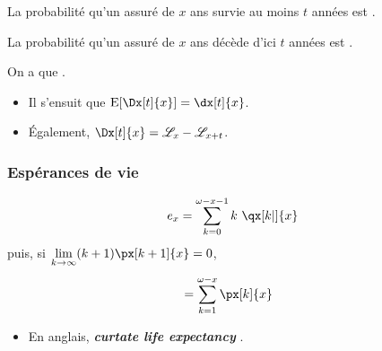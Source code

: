 \documentclass[10pt, french]{article}
\begin{document}
\begin{multicols*}{2}
\begin{definitionNOHFILLsub}
La probabilité qu'un assuré de $x$ ans survie au moins $t$ années est .
\end{definitionNOHFILLsub}

\begin{definitionNOHFILLsub}
La probabilité qu'un assuré de $x$ ans décède d'ici $t$ années est .
\end{definitionNOHFILLsub}


\begin{definitionNOHFILL}
On a que .

\begin{itemize}
	\item	Il s'ensuit que $\text{E}[\Dx[t]{x}] = \dx[t]{x}$.
	\item	Également, $\Dx[t]{x} = \mathscr{L}_{x} - \mathscr{L}_{x + t}$.
\end{itemize}
\end{definitionNOHFILL}


\columnbreak
\subsubsection{Espérances de vie}
\setlength{\mathindent}{-1cm}
\begin{definitionNOHFILLsub}
\begin{align*}
	e_{x}
	&=	\sum_{k = 0}^{\omega - x - 1} k \ \qx[k | ]{x}	\\
\end{align*}
puis, si $\limz{k}{\infty} (k + 1) \px[k + 1]{x} = 0$, 
\begin{align*}
	&=	\sum_{k = 1}^{\omega - x} \px[k]{x}
\end{align*}

\begin{itemize}
	\item	En anglais, \og \textit{\textbf{curtate life expectancy}} \fg{}.
\end{itemize}
\end{definitionNOHFILLsub}
\setlength{\mathindent}{1cm}




\end{multicols*}
\end{document}
